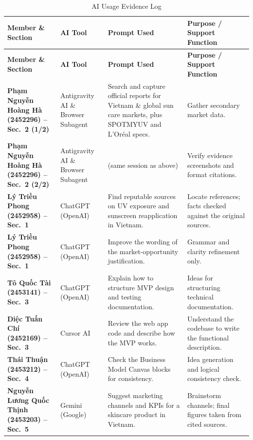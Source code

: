 \begin{singlespace}
\small
\setlength{\tabcolsep}{4pt}
\begin{longtable}{@{}L{3.0cm}L{2.4cm}L{5.0cm}L{4.0cm}@{}}
\caption{AI Usage Evidence Log}\label{tab:ai-log}\\
  \toprule
  \textbf{Member \& Section} & \textbf{AI Tool} & \textbf{Prompt Used} & \textbf{Purpose / Support Function}\\
  \midrule
  \endfirsthead
  \toprule
  \textbf{Member \& Section} & \textbf{AI Tool} & \textbf{Prompt Used} & \textbf{Purpose / Support Function}\\
  \midrule
  \endhead
  \bottomrule
  \endfoot
  \textbf{Phạm Nguyễn Hoàng Hà (2452296) -- Sec.~2 (1/2)} & Antigravity AI \& Browser Subagent & Search and capture official reports for Vietnam \& global sun care markets, plus SPOTMYUV and L'Or\'eal specs. & Gather secondary market data.\\
  \addlinespace
  \textbf{Phạm Nguyễn Hoàng Hà (2452296) -- Sec.~2 (2/2)} & Antigravity AI \& Browser Subagent & (same session as above) & Verify evidence screenshots and format citations.\\
  \addlinespace
  \textbf{Lý Triều Phong (2452958) -- Sec.~1} & ChatGPT (OpenAI) & Find reputable sources on UV exposure and sunscreen reapplication in Vietnam. & Locate references; facts checked against the original sources.\\
  \addlinespace
  \textbf{Lý Triều Phong (2452958) -- Sec.~1} & ChatGPT (OpenAI) & Improve the wording of the market-opportunity justification. & Grammar and clarity refinement only.\\
  \addlinespace
  \textbf{Tô Quốc Tài (2453141) -- Sec.~3} & ChatGPT (OpenAI) & Explain how to structure MVP design and testing documentation. & Ideas for structuring technical documentation.\\
  \addlinespace
  \textbf{Diệc Tuấn Chí (2452169) -- Sec.~3} & Cursor AI & Review the web app code and describe how the MVP works. & Understand the codebase to write the functional description.\\
  \addlinespace
  \textbf{Thái Thuận (2453212) -- Sec.~4} & ChatGPT (OpenAI) & Check the Business Model Canvas blocks for consistency. & Idea generation and logical consistency check.\\
  \addlinespace
  \textbf{Nguyễn Lương Quốc Thịnh (2453203) -- Sec.~5} & Gemini (Google) & Suggest marketing channels and KPIs for a skincare product in Vietnam. & Brainstorm channels; final figures taken from cited sources.\\

\end{longtable}
\end{singlespace}
